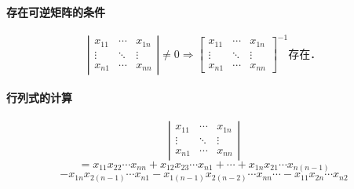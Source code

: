 \documentclass[12pt]{article}
\begin{document}
\begin{CJK}{UTF8}{gbsn}
\paragraph{存在可逆矩阵的条件}
\begin{equation}
\left|
\begin{array}{ccc}
x_{11} & \cdots & x_{1n} \\
\vdots & \ddots & \vdots \\
x_{n1} & \cdots & x_{nn}
\end{array}
\right| \neq 0 \Rightarrow 
\left[
\begin{array}{ccc}
x_{11} & \cdots & x_{1n} \\
\vdots & \ddots & \vdots \\
x_{n1} & \cdots & x_{nn}
\end{array}
\right]^{-1}\text{存在．}
\end{equation}
\paragraph{行列式的计算}
\begin{equation}
\left|
\begin{array}{ccc}
x_{11} & \cdots & x_{1n} \\
\vdots & \ddots & \vdots \\
x_{n1} & \cdots & x_{nn}
\end{array}
\right|
\end{equation}
$$
=x_{11}x_{22}\cdots x_{nn} + x_{12}x_{23}\cdots x_{n1} + \cdots +x_{1n}x_{21}\cdots x_{n(n-1)}
$$
$$
- x_{1n}x_{2(n-1)}\cdots x_{n1}
- x_{1(n-1)}x_{2(n-2)}\cdots x_{nn}
\cdots
- x_{11}x_{2n}\cdots x_{n2}
$$


\end{CJK}
\end{document}
